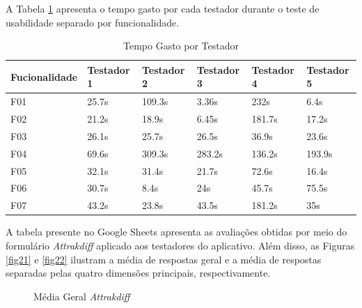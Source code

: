 A Tabela \ref{tab04} apresenta o tempo gasto por cada testador durante o teste de usabilidade separado por funcionalidade.

\begin{table}[h!]
	\centering
	\caption{Tempo Gasto por Testador}
	\label{tab04}
	\begin{tabular}{l|l|l|l|l|l}
	\hline
	Fucionalidade & Testador 1 & Testador 2 & Testador 3 & Testador 4 & Testador 5 \\ 	\hline
	F01                   & 25.7s     & 109.3s     & 3.36s      & 232s       & 6.4s      \\
	F02                   & 21.2s        & 18.9s      & 6.45s      & 181.7s    & 17.2s     \\
	F03                   & 26.1s        & 25.7s      & 26.5s      & 36.9s     & 23.6s     \\
	F04                   & 69.6s        & 309.3s     & 283.2s     & 136.2s     & 193.9s     \\
	F05                   & 32.1s      & 31.4s      & 21.7s     & 72.6s     & 16.4s     \\
	F06                   & 30.7s     & 8.4s      & 24s     & 45.7s     & 75.5s     \\
	F07                   & 43.2s     & 23.8s      & 43.5s     & 181.2s    & 35s      \\ 	\hline
	\end{tabular}
\end{table}


A tabela presente no Google Sheets apresenta as avaliações obtidas por meio do formulário \textit{Attrakdiff} aplicado aos testadores do aplicativo. Além disso, as Figuras \ref{fig21} e \ref{fig22} ilustram a média de respostas geral e a média 
de respostas separadas pelas quatro dimensões principais, respectivamente.

\begin{figure}[h!]
	\centering
	\caption{Média Geral \textit{Attrakdiff}}
	\label{fig20}
\end{figure}


